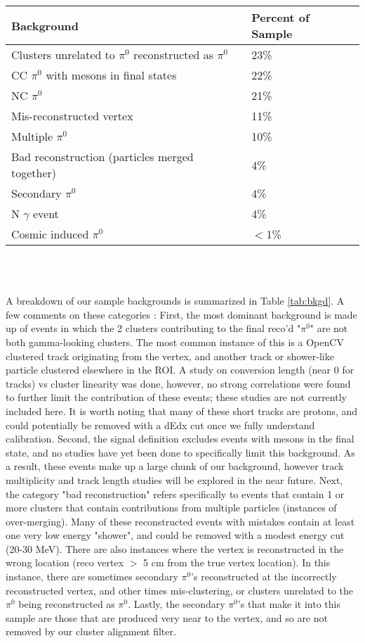\documentclass[12pt]{article}
\begin{document}
\begin{minipage}{\linewidth}
\centering
{} \label{tab:bkgd} 
 \begin{tabular}{| l | l |}
 \hline
 Background & Percent of Sample \\ [0.5ex]
 \hline\hline
\hline
 Clusters unrelated to $\pi^0$ reconstructed as $\pi^0$ & 23\% \\ \hline
  CC $\pi^0$ with mesons in final states & 22\% \\ \hline
  NC $\pi^0$ & 21\% \\ \hline
Mis-reconstructed vertex & 11\% \\ 
 \hline
 Multiple $\pi^0$ & 10\% \\ \hline
 Bad reconstruction (particles merged together) & 4\% \\ \hline
Secondary $\pi^0$ & 4\% \\ \hline 
N $\gamma$ event & 4\% \\ \hline 
Cosmic induced $\pi^0$ & $<$1\% \\ \hline 
 
   \end{tabular}
\end{minipage}
\\\\
\par A breakdown of our sample backgrounds is summarized in Table \ref{tab:bkgd}. A few comments on these categories : First, the most dominant background is made up of events in which the 2 clusters contributing to the final reco'd "$\pi^0$" are not both gamma-looking clusters. The most common instance of this is a OpenCV clustered track originating from the vertex, and another track or shower-like particle clustered elsewhere in the ROI. A study on conversion length (near 0 for tracks) vs cluster linearity was done, however, no strong correlations were found to further limit the contribution of these events; these studies are not currently included here. It is worth noting that many of these short tracks are protons, and could potentially be removed with a dEdx cut once we fully understand calibration. Second, the signal definition excludes events with mesons in the final state, and no studies have yet been done to specifically limit this background. As a result, these events make up a large chunk of our background, however track multiplicity and track length studies will be explored in the near future. Next, the category "bad reconstruction" refers specifically to events that contain 1 or more clusters that contain contributions from multiple particles (instances of over-merging). Many of these reconstructed events with mistakes contain at least one very low energy "shower", and could  be removed with a modest energy cut (20-30 MeV).  There are also instances where the vertex is reconstructed in the wrong location (reco vertex $>$ 5 cm from the true vertex location). In this instance, there are sometimes secondary $\pi^0$'s reconstructed at the incorrectly reconstructed vertex, and other times mis-clustering, or clusters unrelated to the $\pi^0$ being reconstructed as $\pi^0$. Lastly, the secondary $\pi^0$'s that make it into this sample are those that are produced very near to the vertex, and so are not removed by our cluster alignment filter. 
\end{document}
